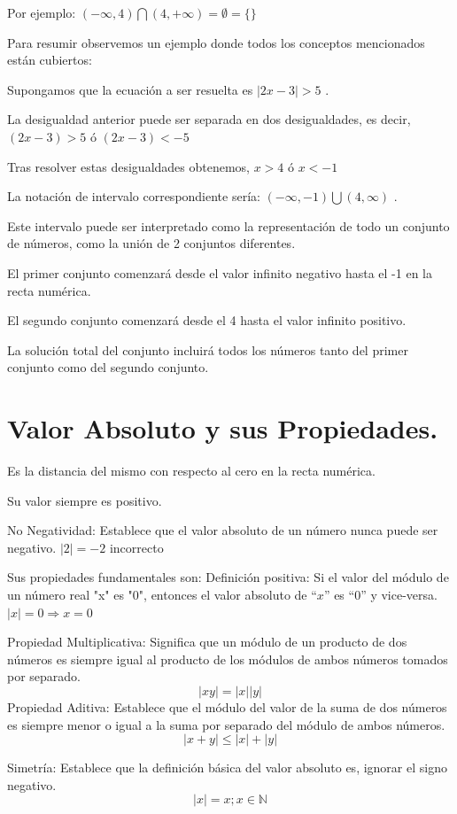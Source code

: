 \documentclass[oneside,spanish,letterpaper]{extbook}
\theoremstyle{mythmstyle}
\begin{document}
Por ejemplo: $(-\infty , 4) \bigcap (4, +\infty )= \emptyset =\{\}$

Para resumir observemos un ejemplo donde todos los conceptos mencionados están cubiertos:

Supongamos que la ecuación a ser resuelta es $|2x-3|>5$ .

La desigualdad anterior puede ser separada en dos desigualdades, es decir, $(2x-3)>5$ ó $(2x-3)<-5$

Tras resolver estas desigualdades obtenemos, $x>4$ ó $x<-1$

La notación de intervalo correspondiente sería: $(-\infty , -1 )\bigcup (4,\infty )$ .

Este intervalo puede ser interpretado como la representación de todo un conjunto de números,
como la unión de 2 conjuntos diferentes.

El primer conjunto comenzará desde el valor infinito negativo hasta el -1 en la recta numérica.

El segundo conjunto comenzará desde el 4 hasta el valor infinito positivo.

La solución total del conjunto incluirá todos los números tanto del primer conjunto como del segundo conjunto.

\cite{cd6} 

\section{Valor Absoluto y sus Propiedades.} 
Es la distancia del mismo con respecto al cero en la recta numérica.

Su valor siempre es positivo.

No Negatividad:
Establece que el valor absoluto de un número nunca puede ser negativo.
$| 2 | = -2$ incorrecto

Sus propiedades fundamentales son:
Definición positiva:
Si el valor del módulo de un número real "x" es "0", entonces el valor absoluto de ``$x$'' es ``0'' y vice-versa.
$| x | = 0\Rightarrow x = 0$

Propiedad Multiplicativa:
Significa que un módulo de un producto de dos números es siempre igual al producto de los módulos
de ambos números tomados por separado.
$$|xy|  = |x||y|$$
Propiedad Aditiva:
Establece que el módulo del valor de la suma de dos números es siempre menor o igual a la suma por separado
del módulo de ambos números.
$$| x+y| \leq |x|+|y|$$

Simetría:
Establece que la definición básica del valor absoluto es, ignorar el signo negativo.
$$|x| = x;x\in\mathbb{N}$$
\end{document}
